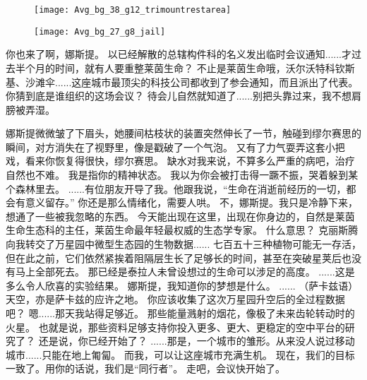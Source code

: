 \documentclass[openany]{book}
\begin{document}
\begin{figure}[h]
    \centering
    \texttt{[image: Avg\_bg\_38\_g12\_trimountrestarea]}
\end{figure}
\begin{figure}[h]
    \centering
    \texttt{[image: Avg\_bg\_27\_g8\_jail]}
\end{figure}
\begin{dialogue}
     你也来了啊，娜斯提。
     以已经解散的总辖构件科的名义发出临时会议通知......才过去半个月的时间，就有人要重整莱茵生命？
     不止是莱茵生命哦，沃尔沃特科钦斯基、沙滩伞......这座城市最顶尖的科技公司都收到了参会通知，而且派出了代表。
     你猜到底是谁组织的这场会议？
     待会儿自然就知道了......别把头靠过来，我不想肩膀被弄湿。\par
    娜斯提微微皱了下眉头，她腰间枯枝状的装置突然伸长了一节，触碰到缪尔赛思的瞬间，对方消失在了视野里，像是戳破了一个气泡。
     又有了力气耍弄这套小把戏，看来你恢复得很快，缪尔赛思。
     缺水对我来说，不算多么严重的病吧，治疗自然也不难。
     我是指你的精神状态。
     我以为你会被打击得一蹶不振，哭着躲到某个森林里去。
     ......有位朋友开导了我。他跟我说，“生命在消逝前经历的一切，都会有意义留存。”
     你还是那么情绪化，需要人哄。
     不，娜斯提。我只是冷静下来，想通了一些被我忽略的东西。
     今天能出现在这里，出现在你身边的，自然是莱茵生命生态科的主任，莱茵生命最年轻最权威的生态学专家。
     什么意思？
     克丽斯腾向我转交了万星园中微型生态园的生物数据......
     七百五十三种植物可能无一存活，但在此之前，它们依然紧挨着阻隔层生长了足够长的时间，甚至在突破星荚后也没有马上全部死去。
     那已经是泰拉人未曾设想过的生命可以涉足的高度。
     ......这是多么令人欣喜的实验结果。
     娜斯提，我知道你的梦想是什么。
     ......
     （萨卡兹语）天空，亦是萨卡兹的应许之地。
     你应该收集了这次万星园升空后的全过程数据吧？
     嗯......那天我站得足够近。
     那些能量溅射的烟花，像极了未来齿轮转动时的火星。
     也就是说，那些资料足够支持你投入更多、更大、更稳定的空中平台的研究了？
     还是说，你已经开始了？
     ......那是，一个城市的雏形。从来没人说过移动城市......只能在地上匍匐。
     而我，可以让这座城市充满生机。
     现在，我们的目标一致了。用你的话说，我们是“同行者”。
     走吧，会议快开始了。
\end{dialogue}
\end{document}
